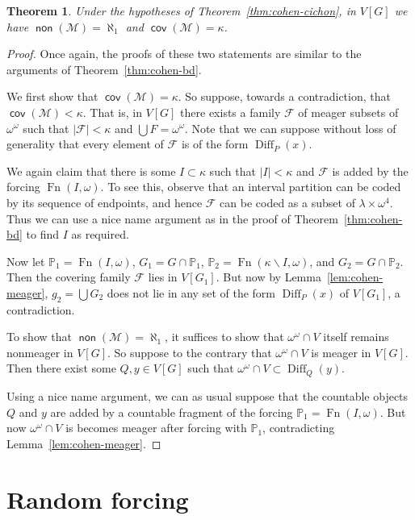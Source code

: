 \documentclass[11pt,oneside]{amsbook}
\newcommand{\PP}{\mathbb P}
\newcommand{\Meager}{\mathcal M}
\DeclareMathOperator{\non}{\mathsf{non}}
\DeclareMathOperator{\cov}{\mathsf{cov}}
\DeclareMathOperator{\Diff}{Diff}
\DeclareMathOperator{\Fn}{Fn}
\theoremstyle{definition}
\theoremstyle{plain}
\newtheorem{theorem}{Theorem}[section]
\theoremstyle{definition}
\theoremstyle{remark}
\numberwithin{equation}{section}
\numberwithin{figure}{section}
\begin{document}
\begin{theorem}
  \label{thm:cohen-meager}
  Under the hypotheses of Theorem~\ref{thm:cohen-cichon}, in $V[G]$ we have $\non(\Meager)=\aleph_1$ and $\cov(\Meager)=\kappa$.
\end{theorem}

\begin{proof}
 Once again, the proofs of these two statements are similar to the arguments of Theorem~\ref{thm:cohen-bd}.

  We first show that $\cov(\Meager)=\kappa$. So suppose, towards a contradiction, that $\cov(\Meager)<\kappa$. That is, in $V[G]$ there exists a family $\mathcal F$ of meager subsets of $\omega^\omega$ such that $|\mathcal F|<\kappa$ and $\bigcup F=\omega^\omega$.  Note that we can suppose without loss of generality that every element of $\mathcal F$ is of the form $\Diff_P(x)$.

  We again claim that there is some $I\subset\kappa$ such that $|I|<\kappa$ and $\mathcal F$ is added by the forcing $\Fn(I,\omega)$. To see this, observe that an interval partition can be coded by its sequence of endpoints, and hence $\mathcal F$ can be coded as a subset of $\lambda\times\omega^4$. Thus we can use a nice name argument as in the proof of Theorem~\ref{thm:cohen-bd} to find $I$ as required.

  Now let $\PP_1=\Fn(I,\omega)$, $G_1=G\cap\PP_1$, $\PP_2=\Fn(\kappa\smallsetminus I,\omega)$, and $G_2=G\cap\PP_2$. Then the covering family $\mathcal F$ lies in $V[G_1]$. But now by Lemma~\ref{lem:cohen-meager}, $g_2=\bigcup G_2$ does not lie in any set of the form $\Diff_P(x)$ of $V[G_1]$, a contradiction.

  To show that $\non(\Meager)=\aleph_1$, it suffices to show that $\omega^\omega\cap V$ itself remains nonmeager in $V[G]$. So suppose to the contrary that $\omega^\omega\cap V$ is meager in $V[G]$. Then there exist some $Q,y\in V[G]$ such that $\omega^\omega\cap V\subset\Diff_Q(y)$.

  Using a nice name argument, we can as usual suppose that the countable objects $Q$ and $y$ are added by a countable fragment of the forcing $\PP_1=\Fn(I,\omega)$. But now $\omega^\omega\cap V$ is becomes meager after forcing with $\PP_1$, contradicting Lemma~\ref{lem:cohen-meager}.
\end{proof}



\newpage
\section{Random forcing}
\end{document}

